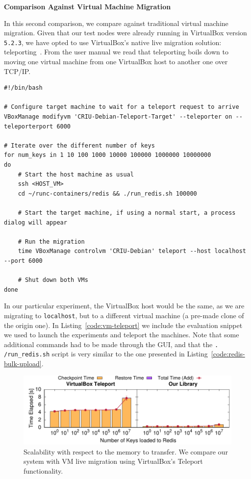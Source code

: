 \textbf{Comparison Against Virtual Machine Migration}

In this second comparison, we compare against traditional virtual machine
migration.
Given that our test nodes were already running in VirtualBox version
\texttt{5.2.3}, we have opted to use VirtualBox's native live migration
solution: teleporting~\cite{vbox-teleport}.
From the user manual we read that teleporting boils down to moving one virtual
machine from one VirtualBox host to another one over TCP/IP.

\begin{lstlisting}[style=Bash,caption={Script to teleport a VirtualBox VM, and run the macro-benchmark.},label={code:vm-teleport}]
#!/bin/bash

# Configure target machine to wait for a teleport request to arrive
VBoxManage modifyvm 'CRIU-Debian-Teleport-Target' --teleporter on --teleporterport 6000

# Iterate over the different number of keys
for num_keys in 1 10 100 1000 10000 100000 1000000 10000000
do
    # Start the host machine as usual
    ssh <HOST_VM>
    cd ~/runc-containers/redis && ./run_redis.sh 100000

    # Start the target machine, if using a normal start, a process dialog will appear

    # Run the migration
    time VBoxManage controlvm 'CRIU-Debian' teleport --host localhost --port 6000

    # Shut down both VMs
done
\end{lstlisting}

In our particular experiment, the VirtualBox  host would be the same, as we are
migrating to \texttt{localhost}, but to a different virtual machine (a pre-made
clone of the origin one).
In Listing~\ref{code:vm-teleport} we include the evaluation snippet we used to
launch the experiments and teleport the machines.
Note that some additional commands had to be made through the GUI, and that the
\texttt{.
    /run\_redis.sh} script is very similar to the one presented in
Listing~\ref{code:redis-bulk-upload}.

\begin{figure}[h!]
    \centering
    \includegraphics[width=\textwidth]{figs/vm-teleport/vm_teleport.pdf}
    \caption[Scalability comparison with VirtualBox Teleport.]{Scalability with
        respect to the memory to transfer.
        We compare our system with VM live migration using VirtualBox's Teleport
        functionality.
        \label{fig:vm-teleport}}
\end{figure}

